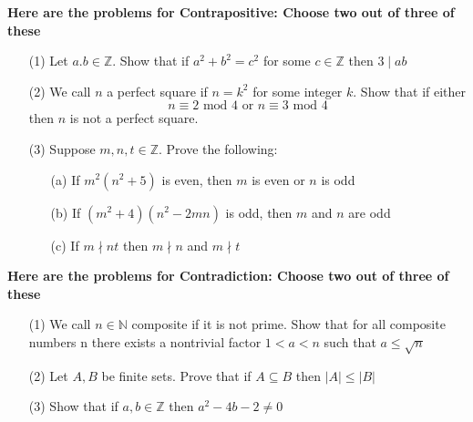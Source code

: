 \documentclass[answers,12pt]{exam}
\newcommand{\br}{\hfill \break}
\newcommand{\Z}{\mathbb{Z}}
\newcommand{\N}{\mathbb{N}}
\newcommand{\bs}{\begin{solution}}
\newcommand{\es}{\end{solution}}
\begin{document}
\br
\textbf{Here are the problems for Contrapositive: Choose two out of three of these}
\begin{enumerate}
    \item [(1)] Let \(a.b \in \Z\). Show that if \(a^2 + b^2 = c^2 \) for some \(c \in \Z\) then \(3 \mid ab\)
    \bs
    \es
    
    \item [(2)] We call \(n\) a perfect square if \(n= k^2\) for some integer \(k\). Show that if either \[n \equiv 2 \text{ mod } 4 \text{  or  } n \equiv 3 \text{ mod } 4\] then \(n\) is not a perfect square.
    \bs
    \es
    \item [(3)] Suppose \(m,n,t \in \Z\). Prove the following: \begin{enumerate}
        \item [(a)] If \(m^2(n^2+5)\) is even, then \(m\) is even or \(n\) is odd
        \item [(b)] If \((m^2+4)(n^2-2mn)\) is odd, then \(m\) and \(n\) are odd
        \item [(c)] If \(m \nmid nt\) then \(m \nmid n \) and \(m \nmid t\)
    \end{enumerate}
    \bs
    \es
\end{enumerate}

\br
\textbf{Here are the problems for Contradiction: Choose two out of three of these}
\begin{enumerate}
    \item [(1)] We call \(n \in \N\) composite if it is not prime. Show that for all composite numbers n there exists a nontrivial factor \( 1 < a < n \) such that \(a \le \sqrt{n}\)
    \bs
    \es
    
    \item [(2)] Let \(A, B\) be finite sets. Prove that if \(A \subseteq B\) then \(|A| \le |B|\)
    \bs
    \es
    \item [(3)] Show that if \(a, b \in \Z\) then \(a^2 - 4b - 2 \ne 0\)
    \bs
    \es
\end{enumerate}
\end{document}
